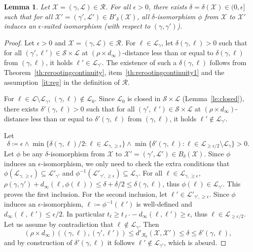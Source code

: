 \documentclass[11pt]{article}
\newtheorem{lemma}[theorem]{Lemma}
\def\Conf{{\mathscr{R}}}
\begin{document}
\begin{lemma}
  \label{le:suited}
  Let $\mathcal{X}=(\gamma,\mathcal{L})\in\Conf$. For all $\epsilon>0$, there exists $\delta=\delta(\mathcal{X})\in(0,\epsilon]$ such that for all $\mathcal{X}'=(\gamma',\mathcal{L}')\in B'_{\delta}(\mathcal{X})$, all $\delta$-isomorphism $\phi$ from $\mathcal{X}$ to $\mathcal{X}'$ induces an $\epsilon$-suited isomorphism (with respect to $(\gamma,\gamma')$).
\end{lemma}
\begin{proof}
  Let $\epsilon>0$ and $\mathcal{X}=(\gamma,\mathcal{L})\in\Conf$. For $\ell\in \mathcal{L}_\gamma$, let $\delta(\gamma,\ell)>0$ such that for all $(\gamma',\ell')\in \mathscr{S}\times \mathscr{L}$ at $(\rho\times d_\infty)$-distance less than or equal to $\delta(\gamma,\ell)$ from $(\gamma,\ell)$, it holds $\ell'\in \mathscr{L}_{\gamma'}$.
  The existence of such a $\delta(\gamma,\ell)$ follows from Theorem~\ref{th:rerootingcontinuity}, item~\ref{th:rerootingcontinuity1} and the assumption~\eqref{it:reg} in the definition of $\Conf$.

  For $\ell\in \mathcal{L}\setminus \mathcal{L}_\gamma $, $(\gamma,\ell)\notin \mathscr{L}_0$.
  Since $\mathscr{L}_0$ is closed in $\mathscr{S}\times \mathscr{L}$ (Lemma~\ref{le:closed}), there exists
  $\delta'(\gamma,\ell)>0$ such that for all $(\gamma',\ell')\in \mathscr{S}\times \mathscr{L}$ at $(\rho\times d_\infty)$-distance less than or equal to $\delta'(\gamma,\ell)$ from $(\gamma,\ell)$, it holds $\ell'\notin \mathscr{L}_{\gamma'}$.

  Let \[\delta\coloneqq\epsilon \wedge \min \{\delta(\gamma,\ell)/2 : \ell \in \mathcal{L}_{\gamma, \geq \epsilon} \}
  \wedge \min \{ \delta'(\gamma,\ell) : \ell \in \mathcal{L}_{ \geq \epsilon/2}\setminus \mathcal{L}_\gamma \}
  >0.\]
  Let $\phi$ be any $\delta$-isomorphism from $\mathcal{X}$ to $\mathcal{X}'=(\gamma',\mathcal{L}')\in B_{\delta}(\mathcal{X})$. Since $\phi$ induces an $\epsilon$-isomorphism, we only need to check the extra conditions that $\phi(\mathcal{L}_{\gamma,\geq \epsilon})\subseteq \mathcal{L}'_{\gamma'}$ and $\phi^{-1}(\mathcal{L}'_{\gamma',\geq \epsilon})\subseteq \mathcal{L}_{\gamma}$. For all $\ell \in \mathcal{L}_{\gamma,\geq \epsilon}$,
  $\rho(\gamma,\gamma')+ d_\infty(\ell,\phi(\ell))\leq \delta+\delta/2\leq \delta(\gamma,\ell)$, thus $\phi(\ell)\in \mathscr{L}_{\gamma'}$. This proves the first inclusion.
  For the second inclusion, let $\ell'\in \mathcal{L}'_{\gamma',\geq \epsilon}$. Since $\phi$ induces an $\epsilon$-isomorphism,  $\ell\coloneqq \phi^{-1}(\ell')$ is well-defined and $d_\infty(\ell,\ell')\leq \epsilon/2$. In particular $t_{\ell}\geq t_{\ell'}-d_\infty(\ell,\ell')\geq \epsilon$, thus $\ell\in \mathcal{L}_{\geq \epsilon/2}$.
  Let us assume by contradiction that $\ell \notin \mathcal{L}_\gamma$. Then \[(\rho\times d_\infty)((\gamma,\ell),(\gamma',\ell'))\leq d'_{\mathcal{R}_0}(\mathcal{X},\mathcal{X}')\leq  \delta\leq \delta'(\gamma,\ell),\]
  and by construction of $\delta'(\gamma,\ell)$ it follows $\ell'\notin \mathscr{L}_{\gamma'}$, which is absurd.
\end{proof}
\end{document}
